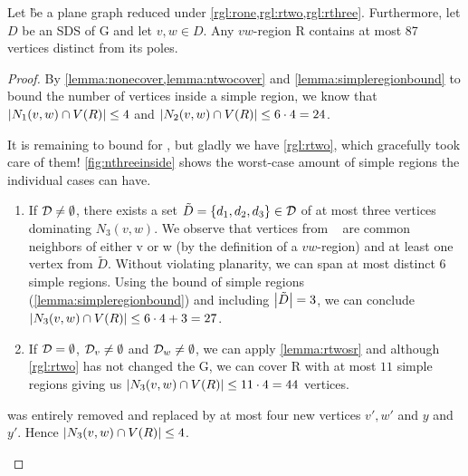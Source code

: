 \begin{lemma}\label{lemma:inside}
    Let \G be a plane graph reduced under \cref{rgl:rone,rgl:rtwo,rgl:rthree}. Furthermore, let $D$ be an SDS of G and let $v,w \in D$. Any $vw$-region R contains at most 87 vertices distinct from its poles.
\end{lemma}
\begin{proof} 
    By \cref{lemma:nonecover,lemma:ntwocover} and \cref{lemma:simpleregionbound} to bound the number of vertices inside a simple region, we know that $\abs{N_1(v,w) \cap V(R)} \leq 4$ and $\abs{N_2(v,w) \cap V(R)} \leq 6 \cdot 4 = 24$.
    
    It is remaining to bound for \nthi, but gladly we have \cref{rgl:rtwo}, which gracefully took care of them! \cref{fig:nthreeinside} shows the worst-case amount of simple regions the individual cases can have.
    
    \begin{caseofz}

        \begin{enumerate}
            \item If $\mathcal{D} \neq \emptyset$, there exists a set $\tilde D = \{d_1,d_2,d_3\} \in \mathcal{D}$ of at most three vertices dominating $N_3(v,w)$. We observe that vertices from \nthi~ are common neighbors of either v or w (by the definition of a $vw$-region) and at least one vertex from $\tilde D$. Without violating planarity, we can span at most distinct 6 simple regions. Using the bound of simple regions (\cref{lemma:simpleregionbound}) and including $\abs{\tilde D} = 3$, we can conclude $\abs{N_3(v,w) \cap V(R)} \leq 6 \cdot 4 + 3 = 27$.
            \item If $\mathcal{D} = \emptyset$, $\mathcal{D}_{v} \neq \emptyset$ and $\mathcal{D}_{w} \neq \emptyset$, we can apply \cref{lemma:rtwosr} and although \cref{rgl:rtwo} has not changed the G, we can cover R with at most $11$ simple regions giving us $\abs{N_3(v,w) \cap V(R)} \leq 11 \cdot 4 = 44$ vertices.
        \end{enumerate}
        
         \ntwi was entirely removed and \nthi replaced by at most four new vertices $v', w'$ and $y$ and $y'$. Hence $\abs{N_3(v,w) \cap V(R)} \leq 4$.


\end{caseofz}
\end{proof}

